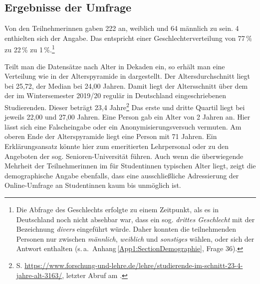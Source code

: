 
\subsection{Ergebnisse der Umfrage}

\label{K6:subsec:Ergebnisse-Umfrage}



\label{K6:subsub:Grundlegendes-Umfrageergebnisse}



Von den Teilnehmer{\textperiodcentered}innen gaben 222 an, weiblich und 64 männlich zu sein. 4 enthielten sich der Angabe. Das entspricht einer Geschlechterverteilung von 77\,\% zu 22\,\% zu 1\,\%.\footnote{Die Abfrage des Geschlechts erfolgte zu einem Zeitpunkt, als es in Deutschland noch nicht absehbar war, dass ein sog. \emph{drittes Geschlecht} mit der Bezeichnung \emph{divers} eingeführt würde. Daher konnten die teilnehmenden Personen nur zwischen \emph{männlich}, \emph{weiblich} und \emph{sonstiges} wählen, oder sich der Antwort enthalten (s.\,a.\ Anhang\,\ref{App1:SectionDemographie}, Frage 36).}

Teilt man die Datensätze nach Alter in Dekaden ein, so erhält man eine Verteilung wie in der Alterspyramide in  dargestellt. Der Altersdurchschnitt liegt bei 25,72, der Median bei 24,00 Jahren. Damit liegt der Altersschnitt über dem der im Wintersemester 2019/20 regulär in Deutschland eingeschriebenen Studierenden. Dieser beträgt 23,4 Jahre\footnote{S. \url{https://www.forschung-und-lehre.de/lehre/studierende-im-schnitt-23-4-jahre-alt-3163/}, letzter Abruf am \datum{}.} Das erste und dritte Quartil liegt bei jeweils 22,00 und 27,00 Jahren. Eine Person gab ein Alter von 2 Jahren an. Hier lässt sich eine Falscheingabe oder ein Anonymisierungsversuch vermuten. Am oberen Ende der Alterspyramide liegt eine Person mit 71 Jahren. Ein Erklärungsansatz könnte hier zum emeritierten Lehrpersonal oder zu den Angeboten der sog. Senioren-Universität führen. Auch wenn die überwiegende Mehrheit der Teilnehmer{\textperiodcentered}innen im für Student{\textperiodcentered}innen typischen Alter liegt, zeigt die demographische Angabe ebenfalls, dass eine ausschließliche Adressierung der Online-Umfrage an Student{\textperiodcentered}innen kaum bis unmöglich ist.

